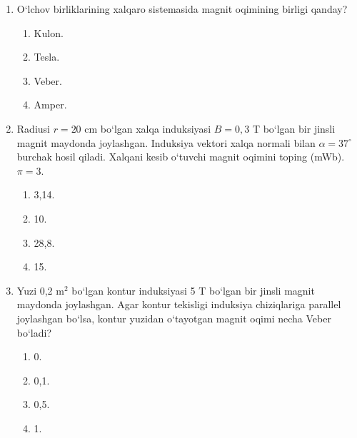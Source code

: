 \begin{enumerate}

\item O‘lchov birliklarining xalqaro sistemasida magnit oqimining birligi qanday?
\begin{enumerate}[label=\Alph*)]
\item Kulon.
\item Tesla.
\item Veber.
\item Amper.
\end{enumerate}

\item Radiusi $r=20$ cm bo‘lgan xalqa induksiyasi $B=0,3$ T bo‘lgan bir jinsli magnit maydonda joylashgan. Induksiya vektori xalqa normali bilan $\alpha=37^\circ$ burchak hosil qiladi. Xalqani kesib o‘tuvchi magnit oqimini toping (mWb). $\pi=3$.


\begin{enumerate}[label=\Alph*)]
\item 3,14.
\item 10.
\item 28,8.
\item 15.
\end{enumerate}

\item Yuzi 0,2 m$^2$ bo‘lgan kontur induksiyasi 5 T bo‘lgan bir jinsli magnit maydonda joylashgan. Agar kontur tekisligi induksiya chiziqlariga parallel joylashgan bo‘lsa, kontur yuzidan o‘tayotgan magnit oqimi necha Veber bo‘ladi?
\begin{enumerate}[label=\Alph*)]
\item 0.
\item 0,1.
\item 0,5.
\item 1.
\end{enumerate}


\end{enumerate}
